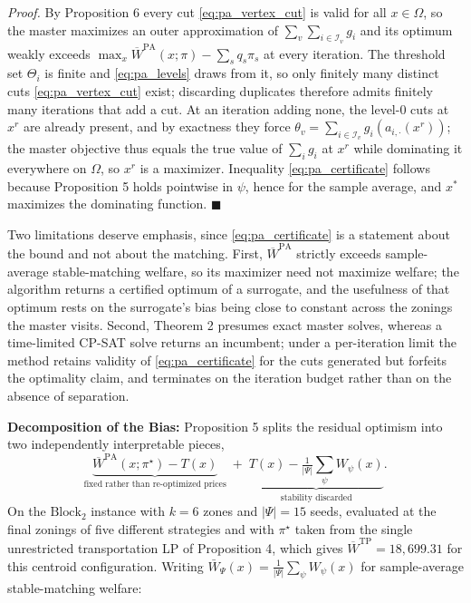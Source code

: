 \documentclass{article}
\begin{document}
\textit{Proof.} By Proposition 6 every cut \eqref{eq:pa_vertex_cut} is valid for all $x \in \Omega$, so the master maximizes an outer approximation of $\sum_v \sum_{i \in \mathcal{I}_v} g_i$ and its optimum weakly exceeds $\max_x \overline{W}^{\mathrm{PA}}(x; \pi) - \sum_s q_s \pi_s$ at every iteration. The threshold set $\Theta_i$ is finite and \eqref{eq:pa_levels} draws from it, so only finitely many distinct cuts \eqref{eq:pa_vertex_cut} exist; discarding duplicates therefore admits finitely many iterations that add a cut. At an iteration adding none, the level-$0$ cuts at $x^r$ are already present, and by exactness they force $\theta_v = \sum_{i \in \mathcal{I}_v} g_i(a_{i, \cdot}(x^r))$; the master objective thus equals the true value of $\sum_i g_i$ at $x^r$ while dominating it everywhere on $\Omega$, so $x^r$ is a maximizer. Inequality \eqref{eq:pa_certificate} follows because Proposition 5 holds pointwise in $\psi$, hence for the sample average, and $x^\ast$ maximizes the dominating function. $\blacksquare$

Two limitations deserve emphasis, since \eqref{eq:pa_certificate} is a statement about the bound and not about the matching. First, $\overline{W}^{\mathrm{PA}}$ strictly exceeds sample-average stable-matching welfare, so its maximizer need not maximize welfare; the algorithm returns a certified optimum of a surrogate, and the usefulness of that optimum rests on the surrogate's bias being close to constant across the zonings the master visits. Second, Theorem 2 presumes exact master solves, whereas a time-limited CP-SAT solve returns an incumbent; under a per-iteration limit the method retains validity of \eqref{eq:pa_certificate} for the cuts generated but forfeits the optimality claim, and terminates on the iteration budget rather than on the absence of separation.

\noindent\textbf{Decomposition of the Bias:}
Proposition 5 splits the residual optimism into two independently interpretable pieces,
\begin{equation}\label{eq:pa_bias}
\underbrace{\overline{W}^{\mathrm{PA}}(x; \pi^\star) - T(x)}_{\text{fixed rather than re-optimized prices}}
\;+\;
\underbrace{T(x) - \tfrac{1}{|\Psi|}\textstyle\sum_\psi W_\psi(x)}_{\text{stability discarded}} .
\end{equation}
On the $\text{Block}_2$ instance with $k = 6$ zones and $|\Psi| = 15$ seeds, evaluated at the final zonings of five different strategies and with $\pi^\star$ taken from the single unrestricted transportation LP of Proposition 4, which gives $\overline{W}^{\mathrm{TP}} = 18{,}699.31$ for this centroid configuration. Writing $\bar{W}_\Psi(x) = \frac{1}{|\Psi|}\sum_{\psi} W_\psi(x)$ for sample-average stable-matching welfare:
\end{document}

